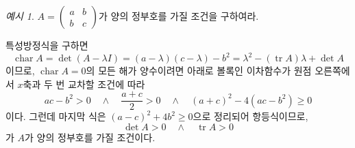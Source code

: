 \documentclass[unfonts,oneside,a4paper]{oblivoir}
\theoremstyle{definition}
\theoremstyle{theorem}
\theoremstyle{theorem}
\theoremstyle{remark}
\theoremstyle{remark}
\theoremstyle{remark}
\newtheorem*{example}{예시}
\theoremstyle{remark}
\DeclareMathOperator{\Char}{char}
\DeclareMathOperator{\tr}{tr}
\begin{document}
\begin{example}
    $A = \begin{pmatrix}a & b\\b & c\end{pmatrix}$가 양의 정부호를 가질 조건을 구하여라.
    \begin{solution}
        특성방정식을 구하면
        \begin{equation*}
            \Char A = \det(A - \lambda I) = (a - \lambda)(c - \lambda) - b^2 = \lambda^2 - (\tr A) \lambda + \det A
        \end{equation*}
        이므로, $\Char A = 0$의 모든 해가 양수이려면 아래로 볼록인 이차함수가 원점 오른쪽에서 $x$축과 두 번 교차할 조건에 따라
        \begin{equation*}
            ac - b^2 > 0 \quad \wedge \quad \frac{a + c}{2} > 0 \quad \wedge \quad (a + c)^2 - 4(ac - b^2) \geq 0
        \end{equation*}
        이다.
        그런데 마지막 식은 $(a - c)^2 + 4b^2 \geq 0$으로 정리되어 항등식이므로,
        \begin{equation*}
            \det A > 0 \quad \wedge \quad \tr A > 0
        \end{equation*}
        가 $A$가 양의 정부호를 가질 조건이다.
    \end{solution}
\end{example}
\end{document}
